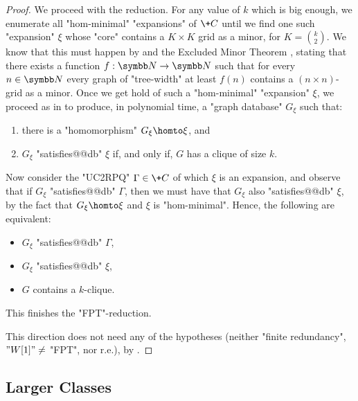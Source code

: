 \begin{proof}
    We proceed with the reduction.
    For any value of $k$ which is big enough, we enumerate all "hom-minimal" "expansions" of $\+C$ until we find one such "expansion" $\xi$ whose "core" contains a $K \times K$ grid as a minor, for $K = {k \choose 2}$.
    We know that this must happen by  and the Excluded Minor Theorem \cite{RobertsonSeymour1986GraphMinors5}, stating that there exists a function $f : \N \to \N$ such that for every $n \in \N$ every graph of "tree-width" at least $f(n)$ contains a $(n \times n)$-grid as a minor.
    Once we get hold of such a "hom-minimal" "expansion" $\xi$, we proceed as in \cite[proof of Theorem~4.1]{Grohe2007ComplexityHomomorphism} to produce, in polynomial time, a "graph database" $G_\xi$ such that:
    \begin{enumerate}
        \item there is a "homomorphism" $G_\xi \homto \xi$, and
        \item $G_\xi$ "satisfies@@db" $\xi$ if, and only if, $G$ has a clique of size $k$.
    \end{enumerate}
Now consider the "UC2RPQ" $\Gamma \in \+C$ of which $\xi$ is an expansion, and observe that if $G_\xi$ "satisfies@@db" $\Gamma$, then we must have that $G_\xi$ also "satisfies@@db" $\xi$, by the fact that $G_\xi \homto \xi$ and $\xi$ is "hom-minimal". Hence, the following are equivalent:
\begin{itemize}
    \item $G_\xi$ "satisfies@@db" $\Gamma$, 
    \item $G_\xi$ "satisfies@@db" $\xi$,
    \item $G$ contains a $k$-clique.
\end{itemize}
This finishes the "FPT"-reduction.

\medskip

 This direction does not need any of the hypotheses (neither "finite redundancy",  $"W[1]" \neq $ "FPT", nor r.e.), by .
\end{proof}

\subsection{Larger Classes}
\label{sec:discussion-stw-larger-classes}

